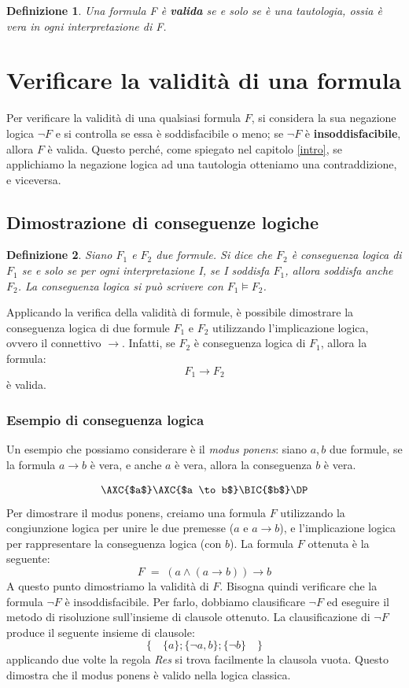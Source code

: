 \documentclass[a4paper,12pt]{report}
\newtheorem{definition}{Definizione}[section]
\begin{document}
\begin{definition}
    Una formula F è \textbf{valida} se e solo se è una tautologia, ossia è vera in ogni interpretazione di F.
\end{definition}

\section{Verificare la validità di una formula}
Per verificare la validità di una qualsiasi formula $F$, si considera la sua negazione logica $\lnot F$ e si controlla se essa è soddisfacibile o meno; se $\lnot F$ è \textbf{insoddisfacibile}, allora $F$ è valida. Questo perché, come spiegato nel capitolo \ref{intro}, se applichiamo la negazione logica ad una tautologia otteniamo una contraddizione, e viceversa.

\subsection{Dimostrazione di conseguenze logiche}

\begin{definition}
    Siano $F_1$ e $F_2$ due formule. Si dice che $F_2$ è conseguenza logica di $F_1$ se e solo se per ogni interpretazione I, se I soddisfa $F_1$, allora soddisfa anche $F_2$. La conseguenza logica si può scrivere con $F_1 \models F_2$.
\end{definition}
Applicando la verifica della validità di formule, è possibile dimostrare la conseguenza logica di due formule $F_1$ e $F_2$ utilizzando l'implicazione logica, ovvero il connettivo $\to$. Infatti, se $F_2$ è conseguenza logica di $F_1$, allora la formula:
\[
    F_1 \to F_2
\]
è valida.
\subsubsection{Esempio di conseguenza logica}
Un esempio che possiamo considerare è il \emph{modus ponens}: siano $a, b$ due formule, se la formula $a \to b$ è vera, e anche $a$ è vera, allora la conseguenza $b$ è vera.

\[
    \AXC{$a$}
    \AXC{$a \to b$}
    \RightLabel{Modus ponens}
    \BIC{$b$}
    \DP
\]
Per dimostrare il modus ponens, creiamo una formula $F$ utilizzando la congiunzione logica per unire le due premesse ($a$ e $a \to b$), e l'implicazione logica per rappresentare la conseguenza logica (con $b$). La formula $F$ ottenuta è la seguente:
\[
    F \; = \; (a \land (a \to b)) \to b
\]
A questo punto dimostriamo la validità di $F$. Bisogna quindi verificare che la formula $\lnot F$ è insoddisfacibile. Per farlo, dobbiamo clausificare $\lnot F$ ed eseguire il metodo di risoluzione sull'insieme di clausole ottenuto. La clausificazione di $\lnot F$ produce il seguente insieme di clausole:
\[
    \{\quad \{a\}; \{\lnot a, b\}; \{\lnot b\} \quad\}
\]
applicando due volte la regola \emph{Res} si trova facilmente la clausola vuota. Questo dimostra che il modus ponens è valido nella logica classica.
\end{document}
